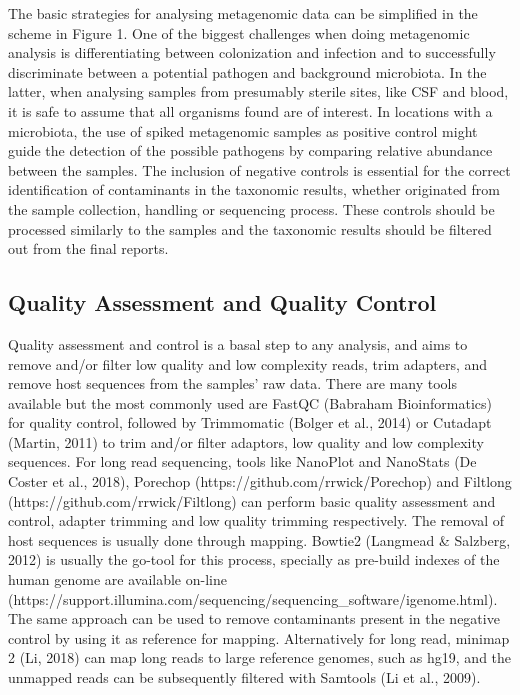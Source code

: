 The basic strategies for analysing metagenomic data can be simplified in the scheme in Figure 1. One of the biggest challenges when doing metagenomic analysis is differentiating between colonization and infection and to successfully discriminate between a potential pathogen and background microbiota. In the latter, when analysing samples from presumably sterile sites, like CSF and blood, it is safe to assume that all organisms found are of interest. In locations with a microbiota, the use of spiked metagenomic samples as positive control might guide the detection of the possible pathogens by comparing relative abundance between the samples. The inclusion of negative controls is essential for the correct identification of contaminants in the taxonomic results, whether originated from the sample collection, handling or sequencing process. These controls should be processed similarly to the samples and the taxonomic results should be filtered out from the final reports. 

\subsection{Quality Assessment and Quality Control}
Quality assessment and control is a basal step to any analysis, and aims to remove and/or filter low quality and low complexity reads, trim adapters, and remove host sequences from the samples’ raw data. There are many tools available but the most commonly used are FastQC (Babraham Bioinformatics) for quality control, followed by Trimmomatic (Bolger et al., 2014) or Cutadapt (Martin, 2011) to trim and/or filter adaptors, low quality and low complexity sequences. For long read sequencing, tools like NanoPlot and NanoStats (De Coster et al., 2018), Porechop (https://github.com/rrwick/Porechop) and Filtlong (https://github.com/rrwick/Filtlong) can perform basic quality assessment and control, adapter trimming and low quality trimming respectively. 
The removal of host sequences is usually done through mapping. Bowtie2 (Langmead & Salzberg, 2012) is usually the go-tool for this process, specially as pre-build indexes of the human genome are available on-line (https://support.illumina.com/sequencing/sequencing\_software/igenome.html). The same approach can be used to remove contaminants present in the negative control by using it as reference for mapping. Alternatively for long read, minimap 2 (Li, 2018) can map long reads to large reference genomes, such as hg19, and the unmapped reads can be subsequently filtered with Samtools (Li et al., 2009). 

